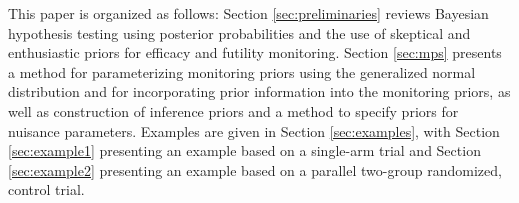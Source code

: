 \documentclass[useAMS,usenatbib,referee]{biom}
\begin{document}
This paper is organized as follows: %
Section \ref{sec:preliminaries} reviews Bayesian hypothesis testing using posterior probabilities and the use of  skeptical and enthusiastic priors for efficacy and futility monitoring. 
%
Section \ref{sec:mps} presents a method for parameterizing monitoring priors using the generalized normal distribution and for incorporating prior information into the monitoring priors, as well as construction of inference priors and a method to specify priors for nuisance parameters.
%
Examples are given in Section \ref{sec:examples}, with Section \ref{sec:example1} presenting an example based on a single-arm trial and Section \ref{sec:example2} presenting an example based on a parallel two-group randomized, control trial.
\end{document}
